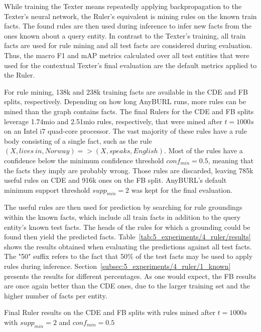 While training the Texter means repeatedly applying backpropagation to the Texter's neural network, the Ruler's equivalent is mining rules on the known train facts. The found rules are then used during inference to infer new facts from the ones known about a query entity. In contrast to the Texter's training, all train facts are used for rule mining and all test facts are considered during evaluation. Thus, the macro F1 and mAP metrics calculated over all test entities that were used for the contextual Texter's final evaluation are the default metrics applied to the Ruler.

For rule mining, 138k and 238k training facts are available in the CDE and FB splits, respectively. Depending on how long AnyBURL runs, more rules can be mined than the graph contains facts. The final Rulers for the CDE and FB splits leverage 1.74mio and 2.51mio rules, respectively, that were mined after $t = 1000s$ on an Intel i7 quad-core processor. The vast majority of these rules have a rule body consisting of a single fact, such as the rule $(X, lives~in, Norway) => (X, speaks, English)$. Most of the rules have a confidence below the minimum confidence threshold $conf_{min} = 0.5$, meaning that the facts they imply are probably wrong. Those rules are discarded, leaving 785k useful rules on CDE and 916k ones on the FB split. AnyBURL's default minimum support threshold $supp_{min} = 2$ was kept for the final evaluation.

The useful rules are then used for prediction by searching for rule groundings within the known facts, which include all train facts in addition to the query entity's known test facts. The heads of the rules for which a grounding could be found then yield the predicted facts. Table~\ref{tab:5_experiments/4_ruler/results} shows the results obtained when evaluating the predictions against all test facts. The "50" suffix refers to the fact that 50\% of the test facts may be used to apply rules during inference. Section~\ref{subsec:5_experiments/4_ruler/1_known} presents the results for different percentages. As one would expect, the FB results are once again better than the CDE ones, due to the larger training set and the higher number of facts per entity.

\begin{table}[h]
    \centering
    
    \caption{Final Ruler results on the CDE and FB splits with rules mined after $t = 1000s$ with $supp_{min} = 2$ and $conf_{min} = 0.5$}
    \label{tab:5_experiments/4_ruler/results}
\end{table}

